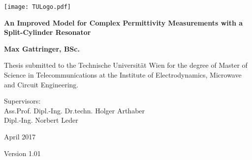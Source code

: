 \begin{titlepage}
\pagestyle{empty}
\begin{center}

\vspace*{1cm}

\texttt{[image: TULogo.pdf]}

\vspace{3cm}

\LARGE

\textbf{An Improved Model for Complex Permittivity Measurements with a Split-Cylinder Resonator}

\vspace{2.5cm}

\Large

\textbf{Max Gattringer, BSc.}

\large

\vspace{4cm}


Thesis submitted to the Technische Universität Wien for the degree of Master of Science in Telecommunications at the Institute of Electrodynamics, Microwave and Circuit Engineering. 

\vspace{1cm}

Supervisors:\\
\Large
Ass.Prof. Dipl.-Ing. Dr.techn. Holger Arthaber\\
Dipl.-Ing. Norbert Leder

                 

\large
\vspace{1.5cm}

April 2017

\vspace{1cm}

Version 1.01
\end{center}
\end{titlepage}
\restoregeometry
\pagestyle{plain}
